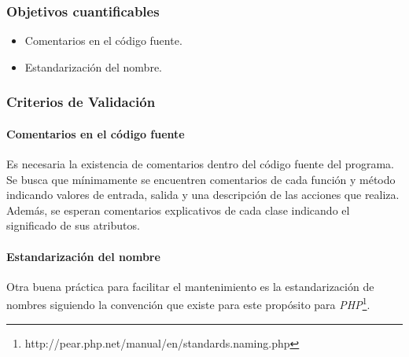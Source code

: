 \subsubsection{Objetivos cuantificables}

\begin{itemize}
	\item
	Comentarios en el código fuente.
	\item
	Estandarización del nombre.

\end{itemize}

\subsubsection{Criterios de Validación}

\paragraph{Comentarios en el código fuente\\}

Es necesaria la existencia de comentarios dentro del código fuente del programa. Se busca que mínimamente se encuentren comentarios de cada función y método indicando valores de entrada, salida y una descripción de las acciones que realiza. Además, se esperan comentarios explicativos de cada clase indicando el significado de sus atributos. 

\paragraph{Estandarización del nombre\\}

Otra buena práctica para facilitar el mantenimiento es la estandarización de nombres siguiendo la convención que existe para este propósito para \emph{PHP}\footnote{http://pear.php.net/manual/en/standards.naming.php}.
